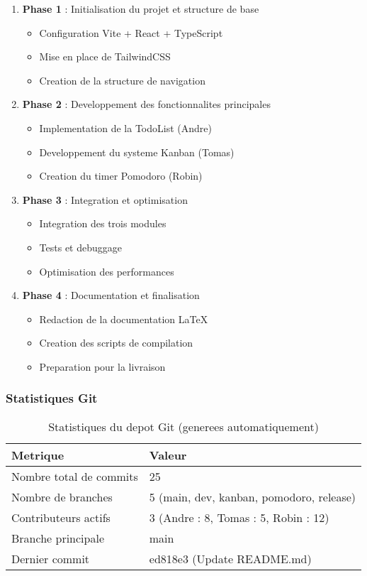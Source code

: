 \documentclass[12pt,a4paper]{article}
\begin{document}
\begin{enumerate}
    \item \textbf{Phase 1} : Initialisation du projet et structure de base
    \begin{itemize}
        \item Configuration Vite + React + TypeScript
        \item Mise en place de TailwindCSS
        \item Creation de la structure de navigation
    \end{itemize}
    
    \item \textbf{Phase 2} : Developpement des fonctionnalites principales
    \begin{itemize}
        \item Implementation de la TodoList (Andre)
        \item Developpement du systeme Kanban (Tomas)
        \item Creation du timer Pomodoro (Robin)
    \end{itemize}
    
    \item \textbf{Phase 3} : Integration et optimisation
    \begin{itemize}
        \item Integration des trois modules
        \item Tests et debuggage
        \item Optimisation des performances
    \end{itemize}
    
    \item \textbf{Phase 4} : Documentation et finalisation
    \begin{itemize}
        \item Redaction de la documentation LaTeX
        \item Creation des scripts de compilation
        \item Preparation pour la livraison
    \end{itemize}
\end{enumerate}

\subsubsection{Statistiques Git}

\begin{table}[H]
\centering
\begin{tabular}{|l|l|}
\hline
\textbf{Metrique} & \textbf{Valeur} \\
\hline
Nombre total de commits & 25 \\
Nombre de branches & 5 (main, dev, kanban, pomodoro, release) \\
Contributeurs actifs & 3 (Andre : 8, Tomas : 5, Robin : 12) \\
Branche principale & main \\
Dernier commit & ed818e3 (Update README.md) \\
\hline
\end{tabular}
\caption{Statistiques du depot Git (generees automatiquement)}
\label{tab:git-stats}
\end{table}
\end{document}

